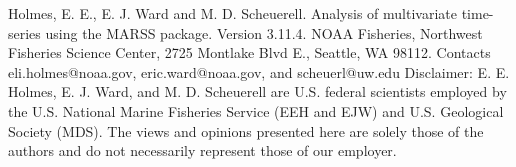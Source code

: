 

\thispagestyle{empty}
\vspace*{14cm}
\vfil
\begin{flushleft}

Holmes, E. E., E. J. Ward and M. D. Scheuerell. Analysis of multivariate time-series using the MARSS package. Version 3.11.4. NOAA Fisheries, Northwest Fisheries Science Center, 2725 Montlake Blvd E., Seattle, WA 98112.  Contacts eli.holmes@noaa.gov, eric.ward@noaa.gov, and scheuerl@uw.edu
\newline
\newline
Disclaimer: E. E. Holmes, E. J. Ward, and M. D. Scheuerell are U.S. federal scientists employed by the U.S. National Marine Fisheries Service (EEH and EJW) and U.S. Geological Society (MDS).  The views and opinions presented here are solely those of the authors and do not necessarily represent those of our employer.

\end{flushleft}

